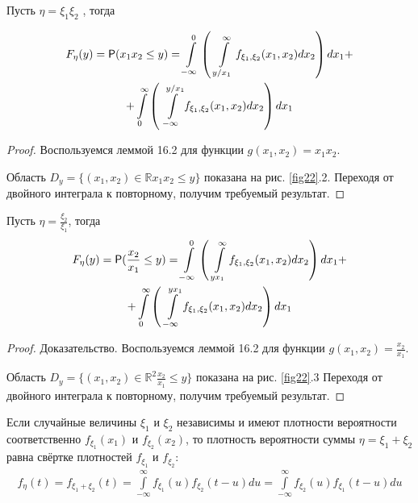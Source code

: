 \begin{lemma}
\label{lemma:16.4}
Пусть $\eta = \xi_1 \xi_2$ , тогда

\begin{gather*}
	F_\eta (y) = \P ( x_1x_2 \leq y ) =
	\int\limits_{-\infty}^{0}\left(
		\,\,\int\limits_{y/x_1}^{\infty} f_{\xi_1,\xi_2} (x_1, x_2 ) dx_2
	\right)dx_1+\\+
	\int\limits_{0}^{\infty}\left(
		\,\,\int\limits^{y/x_1}_{-\infty} f_{\xi_1,\xi_2} (x_1, x_2 ) dx_2
	\right)dx_1
\end{gather*}
\end{lemma}

\begin{proof}
	Воспользуемся леммой 16.2 для функции $g(x_1 , x_2 ) = x_1 x_2$.

Область $D_y = \{(x_1 , x_2 ) \in \mathbb{\mathbb{R}} x_1 x_2 \leq y\}$ показана на рис. \ref{fig22}.2. Переходя от двойного интеграла к повторному, получим требуемый результат.
\end{proof}

\begin{lemma}
\label{lemma:16.5}
Пусть $\eta = \frac{\xi_2}{\xi_1}$, тогда
\begin{gather*}
	F_\eta (y) = \P ( \frac{x_2}{x_1} \leq y ) =
	\int\limits_{-\infty}^{0}\left(
		\,\,\int\limits_{yx_1}^{\infty} f_{\xi_1,\xi_2} (x_1, x_2 ) dx_2
	\right)dx_1+\\+
	\int\limits_{0}^{\infty}\left(
		\,\,\int\limits^{yx_1}_{-\infty} f_{\xi_1,\xi_2} (x_1, x_2 ) dx_2
	\right)dx_1
\end{gather*}
\end{lemma}
\begin{proof}
Доказательство. Воспользуемся леммой 16.2 для функции $g(x_1 , x_2 ) = \frac{x_2}{x_1}$.

Область $D_y = \{(x_1 , x_2 ) \in \mathbb{R}^2  \frac{x_2}{x_1} \leq y\}$ показана на рис. \ref{fig22}.3 Переходя от двойного интеграла к повторному, получим требуемый результат.
\end{proof}

\begin{lemma}[О свёртке]
\label{lemma:16.6}
	Если случайные величины $\xi_1$ и $\xi_2$ независимы
и имеют плотности вероятности соответственно $f_{\xi_1} (x_1 )$ и $f_{\xi_2} (x_2 )$, то плотность вероятности суммы $\eta = \xi_1 + \xi_2$ равна свёртке плотностей $f_{\xi_1}$ и $f_{\xi_2}$:
\begin{gather*}
	f_\eta (t)=f_{\xi_1+\xi_2}(t)=\int\limits_{-\infty}^{\infty} f_{\xi_1} (u)f_{\xi_2} (t - u) du=
	\int\limits_{-\infty}^{\infty} f_{\xi_2}(u)f_{\xi_1} (t - u) du
\end{gather*}
\end{lemma}

